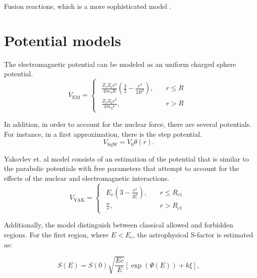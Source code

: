 \documentclass[openany]{book}
\begin{document}
Fusion reactions, which is a more sophisticated model \cite{beard_afanasjev_chamon_gasques_wiescher_yakovlev_2010}.

\section{Potential models} \label{sec:potentialModels}

The electromagnetic potential can be modeled as an uniform charged sphere potential. 
\begin{equation}
V_{\mathrm{EM}} = 	\left\{\begin{array}{l}
	\begin{split}
	 	 \frac{Z_1Z_2e^2}{4\pi\epsilon_0R}\left(\frac{3}{2} - \frac{r^2}{2R^2}\right), \quad &r \le R \\ 
		\frac{Z_1Z_2e^2}{4\pi\epsilon_0r}, \quad &r > R	
		\end{split}
	\end{array}\right.
\end{equation}

In addition, in order to account for the nuclear force, there are several potentials. For instance, in a first approximation, there is the step potential.
\begin{equation}
	V_{\mathrm{SqW}} = V_0\theta(r).
\end{equation}

Yakovlev et. al model \cite{yakovlev_beard_gasques_wiescher_2010} consists of an estimation of the potential that is similar to the parabolic potentials with free parameters that attempt to account for the effects of the nuclear and electromagnetic interactions.  \\


\begin{equation}
	V_{\mathrm{YAK}} = 	\left\{\begin{array}{l}
		\begin{split}
			E_c\left(3 - \frac{r^2}{R_c^2}\right), \quad &r \le R_{c1} \\ 
			\frac{\alpha}{r}, \quad &r > R_{c1}	
		\end{split}
	\end{array}\right.
\end{equation}

Additionally, the model distinguish between classical allowed and forbidden regions.  For the first region, where $E < E_c$, the astrophysical S-factor is estimated as:

\begin{equation}
	S(E) = S(0)\sqrt{\frac{Ec}{E}} [\exp{(\Psi(E))+ k\xi} ],
\end{equation}
\end{document}
